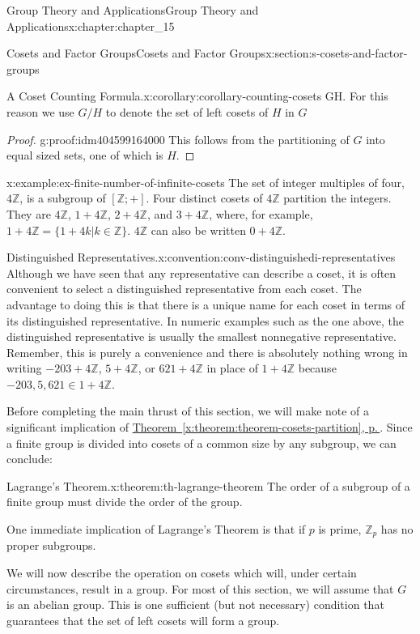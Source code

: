 \documentclass[twoside,10pt,]{book}
\newcommand{\xreffont}{\relax}
\numberwithin{equation}{section}
\begin{document}
\begin{chapterptx}{Group Theory and Applications}{}{Group Theory and Applications}{}{}{x:chapter:chapter_15}
\begin{sectionptx}{Cosets and Factor Groups}{}{Cosets and Factor Groups}{}{}{x:section:s-cosets-and-factor-groups}
\begin{corollary}{A Coset Counting Formula.}{}{x:corollary:corollary-counting-cosets}
{G\rvert }{\lvert H\rvert }\). For this reason we use \(G/H\) to denote the set of left cosets of \(H\) in \(G\)%
\end{corollary}
\begin{proof}{}{g:proof:idm404599164000}
This follows from the partitioning of \(G\) into equal sized sets, one of which is \(H\).%
\end{proof}
\begin{example}{}{x:example:ex-finite-number-of-infinite-cosets}%
The set of integer multiples of four, \(4\mathbb{Z}\), is a subgroup of \([\mathbb{Z}; +]\). Four distinct cosets of \(4\mathbb{Z}\) partition the integers. They are \(4\mathbb{Z}\), \(1+4\mathbb{Z}\), \(2+4\mathbb{Z}\), and \(3+4\mathbb{Z}\), where, for example, \(1+4\mathbb{Z}
= \{1+4k | k \in  \mathbb{Z}\}\).   \(4\mathbb{Z}\) can also be written \(0+4\mathbb{Z}\).%
\end{example}
\begin{convention}{Distinguished Representatives.}{x:convention:conv-distinguishedi-representatives}%
Although we have seen that any representative can describe a coset, it is often convenient to select a distinguished representative from each coset. The advantage to doing this is that there is a unique name for each coset in terms of its distinguished representative. In numeric examples such as the one above, the distinguished representative is usually the smallest nonnegative representative. Remember, this is purely a convenience and there is absolutely nothing wrong in writing \(-203+4\mathbb{Z}\), \(5+4\mathbb{Z}\), or \(621+4\mathbb{Z}\) in place of \(1+4\mathbb{Z}\)  because  \(-203, 5, 621 \in 1+4\mathbb{Z}\).%
\end{convention}
Before completing the main thrust of this section, we will make note of a significant implication of \hyperref[x:theorem:theorem-cosets-partition]{Theorem~{\xreffont\ref{x:theorem:theorem-cosets-partition}}, p.\,\pageref{x:theorem:theorem-cosets-partition}}. Since a finite group is divided into cosets of a common size by any subgroup, we can conclude:%
\begin{theorem}{Lagrange's Theorem.}{}{x:theorem:th-lagrange-theorem}%
%
The order of a subgroup of a finite group must divide the order of the group.%
\end{theorem}
One immediate implication of Lagrange's Theorem is that if \(p\) is prime, \(\mathbb{Z}_p\)  has no proper subgroups.%
\par
We will now describe the operation on cosets which will, under certain circumstances, result in a group. For most of this section, we will assume that \(G\) is an abelian group. This is one sufficient (but not necessary) condition that guarantees that the set of left cosets will form a group.%

\end{sectionptx}
\end{chapterptx}
\end{document}
